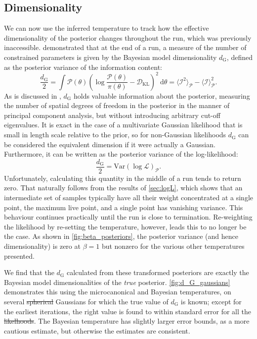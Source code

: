 \documentclass[usenatbib]{mnras}
\newcommand{\Like}{\mathcal{L}}
\newcommand{\DKL}{\mathcal{D}_\mathrm{KL}}
\newcommand{\dG}{d_\mathrm{G}}
\providecommand{\DIFaddtex}[1]{{\protect\color{blue}\uwave{#1}}} %
\providecommand{\DIFdeltex}[1]{{\protect\color{red}\sout{#1}}}                      %
\providecommand{\DIFaddbegin}{} %
\providecommand{\DIFaddend}{} %
\providecommand{\DIFdelbegin}{} %
\providecommand{\DIFdelend}{} %
\providecommand{\DIFadd}[1]{\texorpdfstring{\DIFaddtex{#1}}{#1}} %
\providecommand{\DIFdel}[1]{\texorpdfstring{\DIFdeltex{#1}}{}} %
\newcommand{\DIFscaledelfig}{0.5}
\newlength{\DIFdelgraphicswidth} %
\newlength{\DIFdelgraphicsheight} %
\newcommand{\DIFaddincludegraphics}[2][]{{\color{blue}\fbox{\DIFOincludegraphics[#1]{#2}}}} %
\newcommand{\DIFdelincludegraphics}[2][]{%
\sbox{\DIFdelgraphicsbox}{\DIFOincludegraphics[#1]{#2}}%
\settoboxwidth{\DIFdelgraphicswidth}{\DIFdelgraphicsbox} %
\settoboxtotalheight{\DIFdelgraphicsheight}{\DIFdelgraphicsbox} %
\scalebox{\DIFscaledelfig}{%
\parbox[b]{\DIFdelgraphicswidth}{\usebox{\DIFdelgraphicsbox}\\[-\baselineskip] \rule{\DIFdelgraphicswidth}{0em}}\llap{\resizebox{\DIFdelgraphicswidth}{\DIFdelgraphicsheight}{%
\setlength{\unitlength}{\DIFdelgraphicswidth}%
\begin{picture}(1,1)%
\thicklines\linethickness{2pt} %
{\color[rgb]{1,0,0}\put(0,0){\framebox(1,1){}}}%
{\color[rgb]{1,0,0}\put(0,0){\line( 1,1){1}}}%
{\color[rgb]{1,0,0}\put(0,1){\line(1,-1){1}}}%
\end{picture}%
}\hspace*{3pt}}} %
} %
\DeclareRobustCommand{\DIFaddbegin}{\DIFOaddbegin \let\includegraphics\DIFaddincludegraphics} %
\DeclareRobustCommand{\DIFaddend}{\DIFOaddend \let\includegraphics\DIFOincludegraphics} %
\DeclareRobustCommand{\DIFdelbegin}{\DIFOdelbegin \let\includegraphics\DIFdelincludegraphics} %
\DeclareRobustCommand{\DIFdelend}{\DIFOaddend \let\includegraphics\DIFOincludegraphics} %
\begin{document}
\subsection{Dimensionality}\label{sec:dimensionality}
We can now use the inferred temperature to track how the effective dimensionality of the posterior changes throughout the run, which was previously inaccessible. \citet{Handley_2019} demonstrated that at the end of a run, a measure of the number of constrained parameters is given by the Bayesian model dimensionality $\dG$, defined as the posterior variance of the information content:
\begin{equation}\label{eq:d_G}
    \frac{\dG}{2} = \int \mathcal{P}(\theta) \left(\log \frac{\mathcal{P}(\theta)}{\pi(\theta)} - \DKL\right)^2 \: \mathrm{d}\theta
    = \langle \mathcal{I}^2 \rangle_\mathcal{P} - \langle \mathcal{I} \rangle^2_\mathcal{P}.
\end{equation}
As is discussed in \citet{Handley_2019}, $\dG$ holds valuable information about the posterior, measuring the number of spatial degrees of freedom in the posterior in the manner of principal component analysis, but without introducing arbitrary cut-off eigenvalues. It is exact in the case of a multivariate Gaussian likelihood that is small in length scale relative to the prior, so for non-Gaussian likelihoods $\dG$ can be considered the equivalent dimension if it were actually a Gaussian. Furthermore, it can be written as the posterior variance of the log-likelihood:
\begin{equation}
    \frac{\dG}{2} = \mathrm{Var}(\log\Like)_\mathcal{P}.
\end{equation}
Unfortunately, calculating this quantity in the middle of a run tends to return zero. That naturally follows from the results of \cref{sec:logL}, which shows that an intermediate set of samples typically have all their weight concentrated at a single point, the maximum live point, and a single point has vanishing variance. This behaviour continues practically until the run is close to termination. Re-weighting the likelihood by re-setting the temperature, however, leads this to no longer be the case. As shown in \cref{fig:beta_posteriors}, the posterior variance (and hence dimensionality) is zero at $\beta = 1$ but nonzero for the various other temperatures presented. 
\par
We find that the $\dG$ calculated from these transformed posteriors are exactly the Bayesian model dimensionalities of the \textit{true} posterior. \cref{fig:d_G_gaussians} demonstrates this using the microcanonical and Bayesian temperatures, on several \DIFdelbegin \DIFdel{spherical }\DIFdelend \DIFaddbegin \DIFadd{isotropic }\DIFaddend Gaussians for which the true value of $\dG$ is known; except for the earliest iterations, the right value is found to within standard error for all the \DIFdelbegin \DIFdel{likelhoods}\DIFdelend \DIFaddbegin \DIFadd{likelihoods}\DIFaddend . The Bayesian temperature has slightly larger error bounds, as a more cautious estimate, but otherwise the estimates are consistent. 
\end{document}
